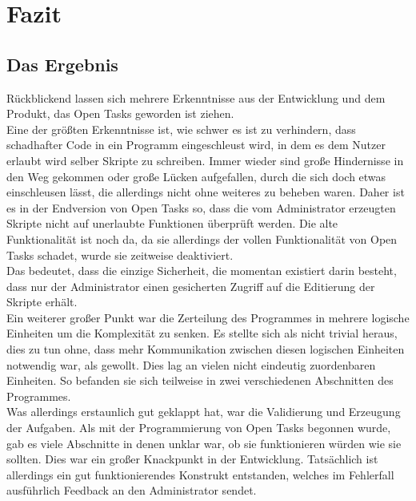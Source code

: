 \chapter{Fazit}




\section{Das Ergebnis}

Rückblickend lassen sich mehrere Erkenntnisse aus der Entwicklung und dem Produkt, das Open Tasks geworden ist ziehen. \\

Eine der größten Erkenntnisse ist, wie schwer es ist zu verhindern, dass schadhafter Code in ein Programm eingeschleust wird, in dem es dem Nutzer erlaubt wird selber Skripte zu schreiben. Immer wieder sind große Hindernisse in den Weg gekommen oder große Lücken aufgefallen, durch die sich doch etwas einschleusen lässt, die allerdings nicht ohne weiteres zu beheben waren. Daher ist es in der Endversion von Open Tasks so, dass die vom Administrator erzeugten Skripte nicht auf unerlaubte Funktionen überprüft werden. Die alte Funktionalität ist noch da, da sie allerdings der vollen Funktionalität von Open Tasks schadet, wurde sie zeitweise deaktiviert. \\
Das bedeutet, dass die einzige Sicherheit, die momentan existiert darin besteht, dass nur der Administrator einen gesicherten Zugriff auf die Editierung der Skripte erhält. \\

Ein weiterer großer Punkt war die Zerteilung des Programmes in mehrere logische Einheiten um die Komplexität zu senken. Es stellte sich als nicht trivial heraus, dies zu tun ohne, dass mehr Kommunikation zwischen diesen logischen Einheiten notwendig war, als gewollt.  Dies lag an vielen nicht eindeutig zuordenbaren Einheiten. So befanden sie sich teilweise in zwei verschiedenen Abschnitten des Programmes. \\

Was allerdings erstaunlich gut geklappt hat, war die Validierung und Erzeugung der Aufgaben. Als mit der Programmierung von Open Tasks begonnen wurde, gab es viele Abschnitte in denen unklar war, ob sie funktionieren würden wie sie sollten. Dies war ein großer Knackpunkt in der Entwicklung. Tatsächlich ist allerdings ein gut funktionierendes Konstrukt entstanden, welches im Fehlerfall ausführlich Feedback an den Administrator sendet. \\

